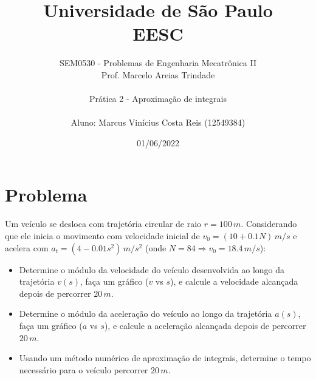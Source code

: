 \documentclass[a4paper, 12pt]{article}
\title{Universidade de São Paulo \\ EESC}
\author{SEM0530 - Problemas de Engenharia Mecatrônica II \\ 
Prof. Marcelo Areias Trindade \\ \\ Prática 2 - Aproximação de integrais
\\ \\ Aluno: Marcus Vinícius Costa Reis (12549384)}
\date{01/06/2022}
\begin{document}
	\maketitle \newpage
	
	\section{Problema}
	
	Um veículo se desloca com trajetória circular de raio $r=100\,m$. Considerando que ele inicia o movimento com velocidade 
	inicial de $v_0=(10+0.1N)\,m/s$ e acelera com $a_t=(4-0.01s^2)\,m/s^2$ (onde $N=84\Rightarrow v_0=18.4\,m/s$):
	
	\begin{itemize}
		\item Determine o módulo da velocidade do veículo desenvolvida ao longo da trajetória $v(s)$, faça um gráfico 
		($v$ vs $s$), e calcule a velocidade alcançada depois de percorrer $20\,m$.
		\item Determine o módulo da aceleração do veículo ao longo da trajetória $a(s)$, faça um gráfico ($a$ vs $s$), e 
		calcule a aceleração alcançada depois de percorrer $20\,m$.
		\item Usando um método numérico de aproximação de integrais, determine o tempo necessário para o veículo 
		percorrer $20\,m$.
	\end{itemize}		
	
\end{document}
